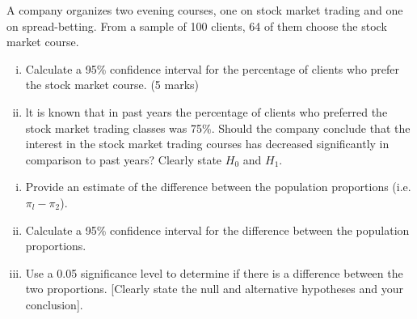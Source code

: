 \item 
A company organizes two evening courses, one on stock market trading and one on
spread-betting. From a sample of 100 clients, 64 of them choose the stock market course.

\begin{enumerate}[(i)]
	\item Calculate a 95\% confidence interval for the percentage of clients who
	prefer the stock market course. (5 marks)
	\item lt is known that in past years the percentage of clients who preferred the
	stock market trading classes was 75\%. Should the company conclude that
	the interest in the stock market trading courses has decreased significantly in
	comparison to past years? Clearly state $H_0$ and $H_1$.
\end{enumerate}

\begin{enumerate}[(i)]
	\item Provide an estimate of the difference between the population
	proportions (i.e. $\pi_l -\pi_2$).
	\item Calculate a 95\% confidence interval for the difference between the
	population proportions.
	\item Use a 0.05 significance level to determine if there is a difference
	between the two proportions. [Clearly state the null and alternative hypotheses
	and your conclusion].
\end{enumerate}
